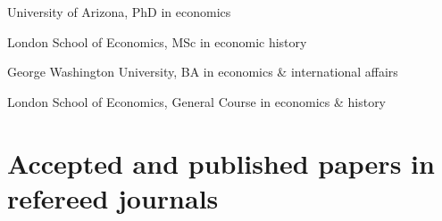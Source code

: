\documentclass[11pt,letterpaper]{article}
\begin{document}
\begin{description}[leftmargin=.75in,itemsep=.25em,itemindent=0in]
  	\item[2009 - 14] 	University of Arizona, PhD in economics 
 	\item[2007 - 08] 	London School of Economics, MSc in economic history 
  	\item[2003 - 07] 	George Washington University, BA in economics \& international affairs 
 	\item[2005 - 06] 	London School of Economics, General Course in economics \& history 
\end{description}

\vspace{-1em}
\section*{Accepted and published papers in refereed journals}
\end{document}
